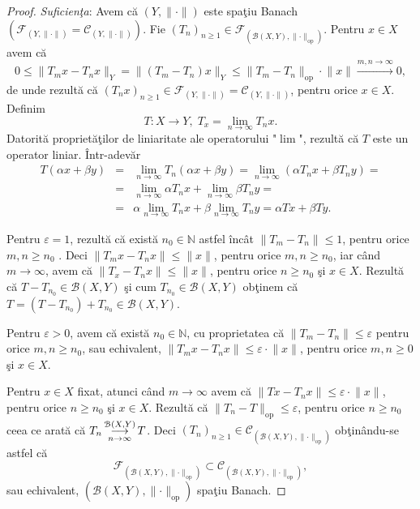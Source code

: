 \documentclass[ a4paper, 12pt]{report}
\theoremstyle{definition}
\theoremstyle{remark}
\numberwithin{equation}{section}
\begin{document}
\begin{proof}
{\it Suficien\c ta}:
Avem c\u a $(Y,\lVert \cdot \rVert)$ este spa\c tiu Banach $(\mathcal{F}_{(Y,\lVert \cdot \rVert)}= \mathcal{C}_{(Y,\lVert \cdot \rVert)})$.
Fie $(T_n)_{n \geq 1} \in \mathcal{F}_{\left( \mathcal{B}(X,Y),\lVert \cdot \rVert_{\mbox{op}}\right)}$.
Pentru  $x \in X$ avem c\u a
$$0 \leq \lVert T_m x - T_n x \rVert_{Y} = \lVert (T_m - T_n )x \rVert_{Y} \leq \lVert T_m-T_n  \rVert_{\mbox{op}} \cdot \lVert x \rVert \stackrel{m,n \rightarrow \infty}{\longrightarrow} 0, $$
 de unde rezult\u a  c\u a $(T_n x)_{n \geq 1} \in \mathcal{F}_{(Y,\lVert \cdot \rVert)} = \mathcal{C}_{(Y,\lVert \cdot \rVert)}$, pentru orice $x \in X.$
Definim
$$T : X \rightarrow Y,\;  T_x = \lim\limits_{n \rightarrow \infty}T_n x.$$
Datorit\u a propriet\u a\c tilor  de liniaritate ale operatorului "$\lim$", rezult\u a c\u a $T$ este un operator liniar. \^ Intr-adev\u ar
\begin{eqnarray*}
T(\alpha x+\beta y) &=& \lim\limits_{n \to \infty}T_n(\alpha x + \beta y) = \lim\limits_{n \to \infty}(\alpha T_n x + \beta T_n y) = \\
&=&\lim\limits_{n \to \infty}\alpha T_nx + \lim\limits_{n \to \infty} \beta T_n y = \\
&=& \alpha \lim\limits_{n \to \infty} T_nx + \beta \lim\limits_{n \to \infty} T_n y =   \alpha Tx + \beta Ty.
\end{eqnarray*}

Pentru $\varepsilon = 1$, rezult\u a c\u a exist\u a $n_0 \in \mathbb{N}$ astfel \^inc\^at $\lVert T_m-T_n \rVert \leq 1$, pentru orice $m,n \geq n_0$ . Deci $\lVert T_m x - T_n x \rVert \leq \lVert x \rVert$, pentru orice $m,n \geq n_0$, iar c\^and $m \longrightarrow \infty$, avem c\u a  $\lVert T_x - T_n x \rVert \leq \lVert x \rVert$, pentru orice $n \geq n_0$ \c si $x \in X$. Rezult\u a c\u a
$T - T_{n_0} \in \mathcal{B}(X,Y)$ \c si cum $T_{n_0} \in \mathcal{B}(X,Y)$ ob\c tinem c\u a $T = (T - T_{n_0}) + T_{n_0} \in \mathcal{B}(X,Y)$.

Pentru $\varepsilon >0$, avem c\u a exist\u a $n_0 \in \mathbb{N}$, cu proprietatea c\u a $\lVert T_m - T_n \rVert \leq \varepsilon$ pentru orice $m,n \geq n_0$, sau echivalent, $\lVert T_m x - T_n x \rVert \leq \varepsilon \cdot  \lVert x \rVert$, pentru orice $m,n \geq 0$ \c si $x \in X$.

Pentru $x \in X$ fixat, atunci c\^and $m \longrightarrow \infty$ avem c\u a $\lVert Tx - T_n x \rVert \leq \varepsilon \cdot  \lVert x \rVert$, pentru orice $n \geq n_0$ \c si $x \in X$. Rezult\u a c\u a $\lVert T_n - T \rVert_{\mbox{op}} \leq \varepsilon$, pentru orice $n \geq n_0$ ceea ce arat\u a c\u a $T_n \pound\limits_{n \rightarrow \infty}^{\mathcal{B}(X,Y)} T$. Deci $(T_n)_{n \geq 1} \in \mathcal{C}_{\left( \mathcal{B}(X,Y),  \lVert \cdot \rVert_{\mbox{op}}\right)}$ ob\c tin\^ andu-se astfel c\u a
$$\mathcal{F}_{\left( \mathcal{B}(X,Y),  \lVert \cdot \rVert_{\mbox{op}}\right)} \subset \mathcal{C}_{\left( \mathcal{B}(X,Y),  \lVert \cdot \rVert_{\mbox{op}}\right)},$$ sau echivalent, $\left( \mathcal{B}(X,Y),  \lVert \cdot \rVert_{\mbox{op}}\right) $ spa\c tiu Banach.



\end{proof}
\end{document}
